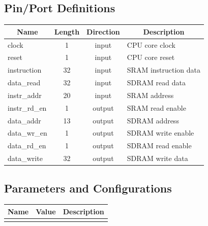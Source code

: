 \documentclass{article}
\begin{document}
 
  \subsection{Pin/Port Definitions}
  \FloatBarrier
  \begin{table}[H]
    \begin{center}
      \begin{tabular}[pos]{| l | c | c | m{7cm} |} \hline 	
      \multicolumn{1}{|c|}{\cellcolor[gray]{0.9}\textbf{Name}} & 
      \multicolumn{1}{c|}{\cellcolor[gray]{0.9}\textbf{Length}} & 
      \multicolumn{1}{c|}{\cellcolor[gray]{0.9}\textbf{Direction}} &
      \multicolumn{1}{c|}{\cellcolor[gray]{0.9}\textbf{Description}} \\ \hline
	 clock 		& 1 	& input 	& CPU core clock  	\\ \hline
	 reset 		& 1	& input		& CPU core reset  	\\ \hline
	 instruction 	& 32	& input 	& SRAM instruction data \\ \hline
	 data\_read 	& 32	& input 	& SDRAM read data \\ \hline
	 instr\_addr 	& 20	& input 	& SRAM address \\ \hline
	 instr\_rd\_en 	& 1	& output 	& SRAM read enable  \\ \hline
	 data\_addr 	& 13	& output	& SDRAM address \\ \hline
	 data\_wr\_en 	& 1	& output 	& SDRAM write enable  \\ \hline
	 data\_rd\_en 	& 1	& output 	& SDRAM read enable  \\ \hline
   data\_write   & 32 & output  & SDRAM write data  \\ \hline
      \end{tabular}
    \end{center}
  \end{table}  
   
  \subsection{Parameters and Configurations}

 \FloatBarrier
  \begin{table}[H]
    \begin{center}
      \begin{tabular}[pos]{| l | l | m{8cm} |} \hline 	
      \multicolumn{1}{|c|}{\cellcolor[gray]{0.9}\textbf{Name}} & 
      \multicolumn{1}{c|}{\cellcolor[gray]{0.9}\textbf{Value}} & 
      \multicolumn{1}{c|}{\cellcolor[gray]{0.9}\textbf{Description}} \\ \hline
	  & &  	\\ \hline
      \end{tabular}
    \end{center}
  \end{table} 
    
\end{document}
